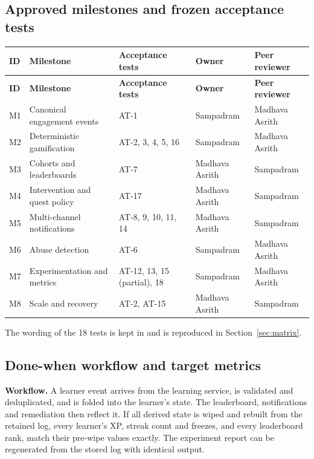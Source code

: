 \documentclass[11pt,a4paper]{article}
\newcommand{\hdr}[1]{\textbf{\color{white}\sffamily\small #1}}
\renewcommand{\_}{\textunderscore\allowbreak{}}
\begin{document}
\subsection{Approved milestones and frozen acceptance tests}

\begin{xltabular}{\textwidth}{@{}L{1.1cm} L{4.1cm} L{2.9cm} L{2.2cm} Y@{}}
 \hdr{ID} & \hdr{Milestone} & \hdr{Acceptance tests} & \hdr{Owner} & \hdr{Peer reviewer} \\
\endfirsthead
{} \hdr{ID} & \hdr{Milestone} & \hdr{Acceptance tests} & \hdr{Owner} & \hdr{Peer reviewer} \\
\endhead
{} M1 & Canonical engagement events & AT-1 & Sampadram & Madhava Asrith \\
M2 & Deterministic gamification & AT-2, 3, 4, 5, 16 & Sampadram & Madhava Asrith \\
 M3 & Cohorts and leaderboards & AT-7 & Madhava Asrith & Sampadram \\
M4 & Intervention and quest policy & AT-17 & Madhava Asrith & Sampadram \\
 M5 & Multi-channel notifications & AT-8, 9, 10, 11, 14 & Madhava Asrith & Sampadram \\
M6 & Abuse detection & AT-6 & Sampadram & Madhava Asrith \\
 M7 & Experimentation and metrics & AT-12, 13, 15 (partial), 18 & Sampadram & Madhava Asrith \\
M8 & Scale and recovery & AT-2, AT-15 & Madhava Asrith & Sampadram \\
\end{xltabular}

The wording of the 18 tests is kept in  and is reproduced in Section~\ref{sec:matrix}.

\subsection{Done-when workflow and target metrics}

\textbf{Workflow.} A learner event arrives from the learning service, is validated and deduplicated, and is folded into the learner's state. The leaderboard, notifications and remediation then reflect it. If all derived state is wiped and rebuilt from the retained log, every learner's XP, streak count and freezes, and every leaderboard rank, match their pre-wipe values exactly. The experiment report can be regenerated from the stored log with identical output.
\end{document}
